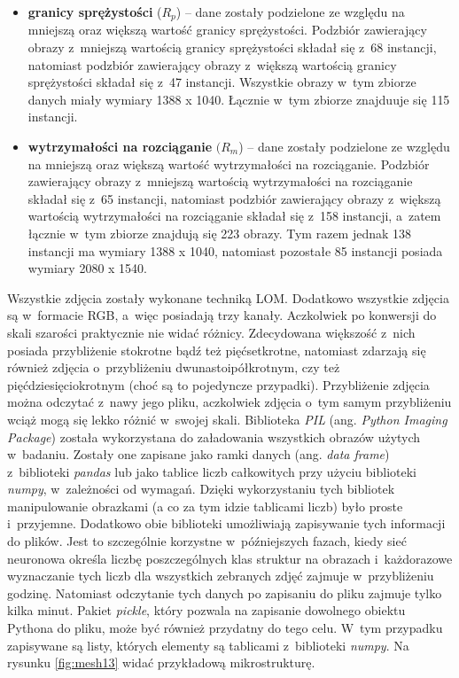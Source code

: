 \begin{itemize}
	\item \textbf{granicy sprężystości} ($R_p$) – dane zostały podzielone ze względu na mniejszą oraz większą wartość granicy sprężystości. Podzbiór zawierający obrazy z~mniejszą wartością granicy sprężystości składał się z~68 instancji, natomiast podzbiór zawierający obrazy z~większą wartością granicy sprężystości składał się z~47 instancji. Wszystkie obrazy w~tym zbiorze danych miały wymiary 1388 x 1040. Łącznie w~tym zbiorze znajduuje się 115 instancji.

	\item \textbf{wytrzymałości na rozciąganie} $(R_{m}$) – dane zostały podzielone ze względu na mniejszą oraz większą wartość wytrzymałości na rozciąganie. Podzbiór zawierający obrazy z~mniejszą wartością wytrzymałości na rozciąganie składał się z~65 instancji, natomiast podzbiór zawierający obrazy z~większą wartością wytrzymałości na rozciąganie składał się z~158 instancji, a~zatem łącznie w~tym zbiorze znajdują się 223 obrazy. Tym razem jednak 138 instancji ma wymiary 1388 x 1040, natomiast pozostałe 85 instancji posiada wymiary 2080 x 1540.
\end{itemize}
Wszystkie zdjęcia zostały wykonane techniką LOM. Dodatkowo wszystkie zdjęcia są w~formacie RGB, a~więc posiadają trzy kanały. Aczkolwiek po konwersji do skali szarości praktycznie nie widać różnicy. Zdecydowana większość z~nich posiada przybliżenie stokrotne bądź też pięćsetkrotne, natomiast zdarzają się również zdjęcia o~przybliżeniu dwunastoipółkrotnym, czy też pięćdziesięciokrotnym (choć są to pojedyncze przypadki). Przybliżenie zdjęcia można odczytać z~nawy jego pliku, aczkolwiek zdjęcia o~tym samym przybliżeniu wciąż mogą się lekko różnić w~swojej skali. Biblioteka \textit{PIL} (ang. \textit{Python Imaging Package}) została wykorzystana do załadowania wszystkich obrazów użytych w~badaniu. Zostały one zapisane jako ramki danych (ang. \textit{data frame}) z~biblioteki \textit{pandas} lub jako tablice liczb całkowitych przy użyciu biblioteki \textit{numpy}, w~zależności od wymagań. Dzięki wykorzystaniu tych bibliotek manipulowanie obrazkami (a co za tym idzie tablicami liczb) było proste i~przyjemne. Dodatkowo obie biblioteki umożliwiają zapisywanie tych informacji do plików. Jest to szczególnie korzystne w~późniejszych fazach, kiedy sieć neuronowa określa liczbę poszczególnych klas struktur na obrazach i~każdorazowe wyznaczanie tych liczb dla wszystkich zebranych zdjęć zajmuje w~przybliżeniu godzinę. Natomiast odczytanie tych danych po zapisaniu do pliku zajmuje tylko kilka minut. Pakiet \textit{pickle}, który pozwala na zapisanie dowolnego obiektu Pythona do pliku, może być również przydatny do tego celu. W~tym przypadku zapisywane są listy, których elementy są tablicami z~biblioteki \textit{numpy}. Na rysunku \ref{fig:mesh13} widać przykładową mikrostrukturę.
